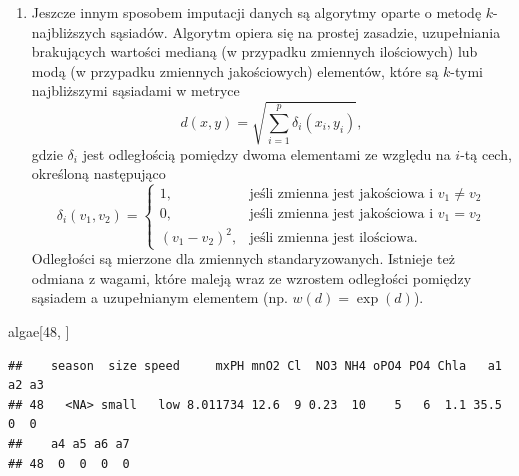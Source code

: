 \documentclass[]{book}
\newenvironment{Shaded}{\begin{snugshade}}{\end{snugshade}}
\newcommand{\DataTypeTok}[1]{\textcolor[rgb]{0.13,0.29,0.53}{#1}}
\newcommand{\DecValTok}[1]{\textcolor[rgb]{0.00,0.00,0.81}{#1}}
\newcommand{\KeywordTok}[1]{\textcolor[rgb]{0.13,0.29,0.53}{\textbf{#1}}}
\newcommand{\NormalTok}[1]{#1}
\newcommand{\OperatorTok}[1]{\textcolor[rgb]{0.81,0.36,0.00}{\textbf{#1}}}
\newcommand{\StringTok}[1]{\textcolor[rgb]{0.31,0.60,0.02}{#1}}
\providecommand{\tightlist}{%
  \setlength{\itemsep}{0pt}\setlength{\parskip}{0pt}}
\theoremstyle{plain}
\theoremstyle{definition}
\begin{document}
\begin{enumerate}
\def\labelenumi{\arabic{enumi}.}
\setcounter{enumi}{3}
\tightlist
\item
  Jeszcze innym sposobem imputacji danych są algorytmy oparte o metodę \(k\)-najbliższych sąsiadów. Algorytm opiera się na prostej zasadzie, uzupełniania brakujących wartości medianą (w przypadku zmiennych ilościowych) lub modą (w przypadku zmiennych jakościowych) elementów, które są \(k\)-tymi najbliższymi sąsiadami w metryce
  \begin{equation}\label{knn}
   d(x,y)=\sqrt{\sum_{i=1}^{p}\delta_i(x_i,y_i)},
  \end{equation}
  gdzie \(\delta_i\) jest odległością pomiędzy dwoma elementami ze względu na \(i\)-tą cech, określoną następująco
  \begin{equation}\label{metryka}
   \delta_i(v_1, v_2)=\begin{cases}
       1,& \text{jeśli zmienna jest jakościowa i }v_1\neq v_2\\
       0,& \text{jeśli zmienna jest jakościowa i }v_1=v_2\\
       (v_1-v_2)^2,& \text{jeśli zmienna jest ilościowa.}
   \end{cases}
  \end{equation}
  Odległości są mierzone dla zmiennych standaryzowanych. Istnieje też odmiana z wagami, które maleją wraz ze wzrostem odległości pomiędzy sąsiadem a uzupełnianym elementem (np. \(w(d)=\exp(d)\)).
\end{enumerate}

\begin{Shaded}
\begin{Highlighting}[]
\NormalTok{algae[}\DecValTok{48}\NormalTok{, ]}
\end{Highlighting}
\end{Shaded}

\begin{verbatim}
##    season  size speed     mxPH mnO2 Cl  NO3 NH4 oPO4 PO4 Chla   a1 a2 a3
## 48   <NA> small   low 8.011734 12.6  9 0.23  10    5   6  1.1 35.5  0  0
##    a4 a5 a6 a7
## 48  0  0  0  0
\end{verbatim}

\begin{Shaded}
\end{Shaded}
\end{document}
